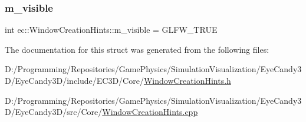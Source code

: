 \mbox{\label{structec_1_1_window_creation_hints_ab32e332ec3126d619bbd920ee3842b3f}} 
\subsubsection{\texorpdfstring{m\+\_\+visible}{m\_visible}}
{\footnotesize\ttfamily int ec\+::\+Window\+Creation\+Hints\+::m\+\_\+visible = G\+L\+F\+W\+\_\+\+T\+R\+UE}



The documentation for this struct was generated from the following files\+:\begin{DoxyCompactItemize}
\item 
D\+:/\+Programming/\+Repositories/\+Game\+Physics/\+Simulation\+Visualization/\+Eye\+Candy3\+D/\+Eye\+Candy3\+D/include/\+E\+C3\+D/\+Core/\mbox{\hyperlink{_window_creation_hints_8h}{Window\+Creation\+Hints.\+h}}\item 
D\+:/\+Programming/\+Repositories/\+Game\+Physics/\+Simulation\+Visualization/\+Eye\+Candy3\+D/\+Eye\+Candy3\+D/src/\+Core/\mbox{\hyperlink{_window_creation_hints_8cpp}{Window\+Creation\+Hints.\+cpp}}\end{DoxyCompactItemize}
